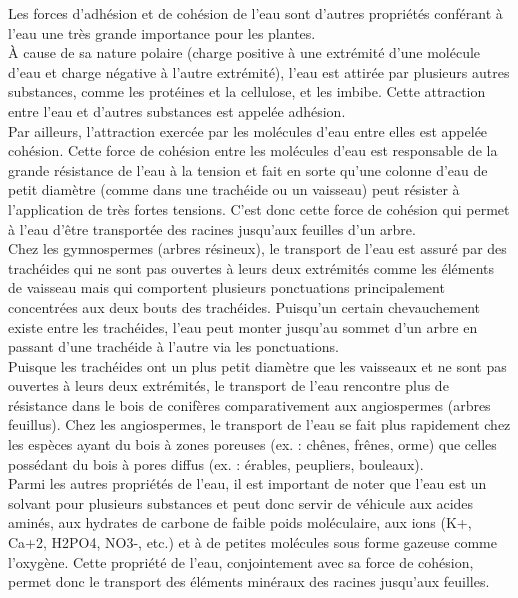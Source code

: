 Les forces d'adhésion et de cohésion de l'eau sont d'autres propriétés conférant à l'eau une très grande importance pour les plantes.\\

À cause de sa nature polaire (charge positive à une extrémité d'une molécule d'eau et charge négative à l'autre extrémité), l'eau est attirée par plusieurs autres substances, comme les protéines et la cellulose, et les imbibe. Cette attraction entre l'eau et d'autres substances est appelée adhésion.\\

Par ailleurs, l'attraction exercée par les molécules d'eau entre elles est appelée cohésion. Cette force de cohésion entre les molécules d'eau est responsable de la grande résistance de l'eau à la tension et fait en sorte qu'une colonne d'eau de petit diamètre (comme dans une trachéide ou un vaisseau) peut résister à l'application de très fortes tensions. C'est donc cette force de cohésion qui permet à l'eau d'être transportée des racines jusqu'aux feuilles d'un arbre.\\

Chez les gymnospermes (arbres résineux), le transport de l'eau est assuré par des trachéides qui ne sont pas ouvertes à leurs deux extrémités comme les éléments de vaisseau mais qui comportent plusieurs ponctuations principalement concentrées aux deux bouts des trachéides. Puisqu'un certain chevauchement existe entre les trachéides, l'eau peut monter jusqu'au sommet d'un arbre en passant d'une trachéide à l'autre via les ponctuations.\\ 

Puisque les trachéides ont un plus petit diamètre que les vaisseaux et ne sont pas ouvertes à leurs deux extrémités, le transport de l'eau rencontre plus de résistance dans le bois de conifères comparativement aux angiospermes (arbres feuillus). Chez les angiospermes, le transport de l'eau se fait plus rapidement chez les espèces ayant du bois à zones poreuses (ex. : chênes, frênes, orme) que celles possédant du bois à pores diffus (ex. : érables, peupliers, bouleaux).\\

Parmi les autres propriétés de l'eau, il est important de noter que l'eau est un solvant pour plusieurs substances et peut donc servir de véhicule aux acides aminés, aux hydrates de carbone de faible poids moléculaire, aux ions (K+, Ca+2, H2PO4, NO3-, etc.) et à de petites molécules sous forme gazeuse comme l'oxygène. Cette propriété de l'eau, conjointement avec sa force de cohésion, permet donc le transport des éléments minéraux des racines jusqu'aux feuilles.\\ 

